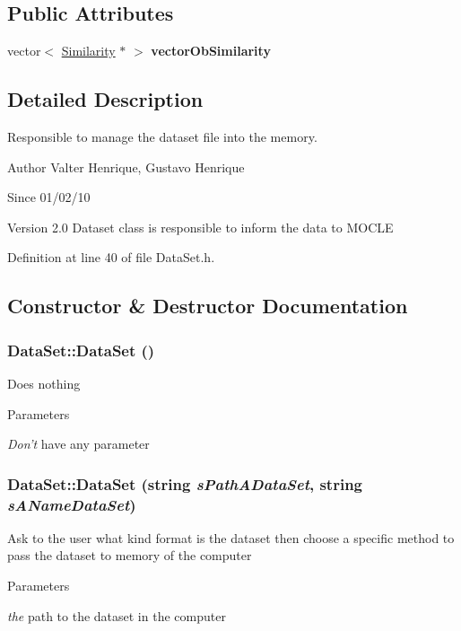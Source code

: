 \subsection*{Public Attributes}
\begin{DoxyCompactItemize}
\item 
\hypertarget{classDataSet_a4fa34425222deba63a72e973ab3b445c}{
vector$<$ \hyperlink{classSimilarity}{Similarity} $\ast$ $>$ {\bfseries vectorObSimilarity}}
\label{classDataSet_a4fa34425222deba63a72e973ab3b445c}

\end{DoxyCompactItemize}


\subsection{Detailed Description}
Responsible to manage the dataset file into the memory. \begin{DoxyAuthor}{Author}
Valter Henrique, Gustavo Henrique 
\end{DoxyAuthor}
\begin{DoxySince}{Since}
01/02/10 
\end{DoxySince}
\begin{DoxyVersion}{Version}
2.0 Dataset class is responsible to inform the data to MOCLE 
\end{DoxyVersion}


Definition at line 40 of file DataSet.h.

\subsection{Constructor \& Destructor Documentation}
\hypertarget{classDataSet_ac9b99505bafd5b1cccf8a361c3ac84a7}{
\subsubsection[{DataSet}]{\setlength{\rightskip}{0pt plus 5cm}DataSet::DataSet ()}}
\label{classDataSet_ac9b99505bafd5b1cccf8a361c3ac84a7}
Does nothing 
\begin{DoxyParams}{Parameters}
\item[{\em Don't}]have any parameter \end{DoxyParams}
\hypertarget{classDataSet_a46b0b094bd833ace0a8f69fc74fadf18}{
\subsubsection[{DataSet}]{\setlength{\rightskip}{0pt plus 5cm}DataSet::DataSet (string {\em sPathADataSet}, \/  string {\em sANameDataSet})}}
\label{classDataSet_a46b0b094bd833ace0a8f69fc74fadf18}
Ask to the user what kind format is the dataset then choose a specific method to pass the dataset to memory of the computer 
\begin{DoxyParams}{Parameters}
\item[{\em the}]path to the dataset in the computer \end{DoxyParams}


